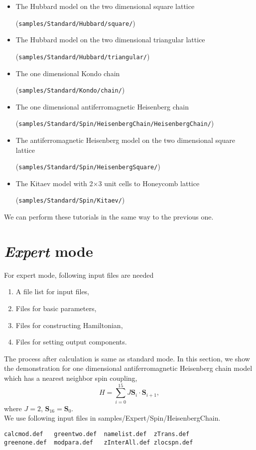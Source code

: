 \begin{itemize}
\item The Hubbard model on the two dimensional square lattice

  (\verb|samples/Standard/Hubbard/square/|)
\item The Hubbard model on the two dimensional triangular lattice
  
  (\verb|samples/Standard/Hubbard/triangular/|)
\item The one dimensional Kondo chain

  (\verb|samples/Standard/Kondo/chain/|)
\item The one dimensional antiferromagnetic Heisenberg chain
  
  (\verb|samples/Standard/Spin/HeisenbergChain/HeisenbergChain/|)
\item The antiferromagnetic Heisenberg model on the two dimensional square lattice
  
  (\verb|samples/Standard/Spin/HeisenbergSquare/|)
\item The Kitaev model with 2$\times$3 unit cells to Honeycomb lattice
  
  (\verb|samples/Standard/Spin/Kitaev/|)
\end{itemize}

We can perform these tutorials in the same way to the previous one.

\section{{\it Expert} mode}
For expert mode, following input files are needed
\begin{enumerate}
\item A file list for input files,
\item Files for basic parameters,
\item Files for constructing Hamiltonian,
\item Files for setting output components.
\end{enumerate}
The process after calculation is same as standard mode. In this section, we show the demonstration for one dimensional antiferromagnetic Heisenberg chain model which has a nearest neighbor spin coupling, 
\begin{equation}
H=\sum_{i=0}^{15} J {\bm S}_i\cdot {\bm S}_{i+1},
\end{equation}
where $J=2$, ${\bm S}_{16}={\bm S}_{0}$.\\
We use following input files in samples/Expert/Spin/HeisenbergChain.\\
\begin{minipage}{15cm}
\begin{screen}
\begin{verbatim}
calcmod.def   greentwo.def  namelist.def  zTrans.def
greenone.def  modpara.def   zInterAll.def zlocspn.def
\end{verbatim}
\end{screen}
\end{minipage}

